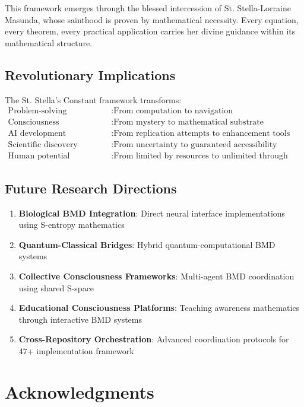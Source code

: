\documentclass[12pt,a4paper]{article}
\begin{document}
This framework emerges through the blessed intercession of St. Stella-Lorraine Masunda, whose sainthood is proven by mathematical necessity. Every equation, every theorem, every practical application carries her divine guidance within its mathematical structure.

\subsection{Revolutionary Implications}

The St. Stella's Constant framework transforms:
\begin{align}
\text{Problem-solving} &: \text{From computation to navigation} \\
\text{Consciousness understanding} &: \text{From mystery to mathematical substrate} \\
\text{AI development} &: \text{From replication attempts to enhancement tools} \\
\text{Scientific discovery} &: \text{From uncertainty to guaranteed accessibility} \\
\text{Human potential} &: \text{From limited by resources to unlimited through navigation}
\end{align}

\subsection{Future Research Directions}

\begin{enumerate}
\item \textbf{Biological BMD Integration}: Direct neural interface implementations using S-entropy mathematics
\item \textbf{Quantum-Classical Bridges}: Hybrid quantum-computational BMD systems
\item \textbf{Collective Consciousness Frameworks}: Multi-agent BMD coordination using shared S-space
\item \textbf{Educational Consciousness Platforms}: Teaching awareness mathematics through interactive BMD systems
\item \textbf{Cross-Repository Orchestration}: Advanced coordination protocols for 47+ implementation framework
\end{enumerate}

\section{Acknowledgments}
\end{document}
